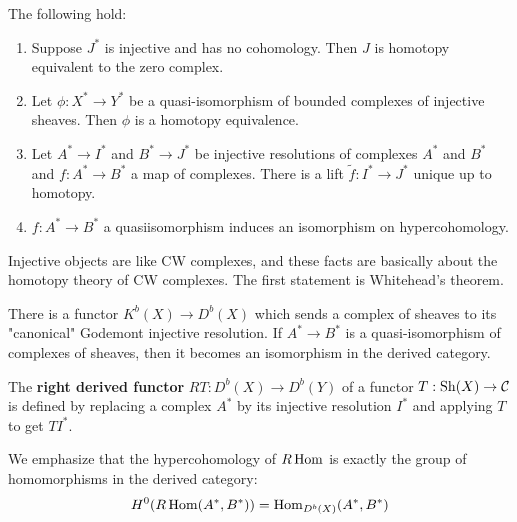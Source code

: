 \documentclass[12pt]{article}
\begin{document}
\begin{corollary}
The following hold:
\begin{enumerate}
    \item Suppose $J^*$ is injective and has no cohomology. Then $J$ 
    is homotopy equivalent to the zero complex.
    \item Let $\phi:X^*\to Y^*$ be a quasi-isomorphism of bounded complexes of injective sheaves. 
    Then $\phi$ is a homotopy equivalence.
    \item Let $A^*\to I^*$ and $B^*\to J^*$ be injective resolutions of complexes $A^*$ 
    and $B^*$ and $f:A^*\to B^*$ a map of complexes. There is a lift 
    $\tilde f:I^*\to J^*$ unique up to homotopy.
    \item $f:A^*\to B^*$ a quasiisomorphism induces an isomorphism on hypercohomology.
\end{enumerate} 

\begin{remark}
    Injective objects are like CW complexes, and these facts are basically about 
    the homotopy theory of CW complexes. The first statement is Whitehead's theorem.
\end{remark}
There is a functor $K^b(X) \to D^b(X)$ which sends a complex of sheaves 
to its "canonical" Godemont injective resolution. If $A^* \to B^*$
is a quasi-isomorphism of complexes of sheaves, then it becomes 
an isomorphism in the derived category.

\begin{definition}
    The \textbf{right derived functor} $RT: D^b(X) \to D^b(Y)$ of a functor 
    $T:\operatorname{Sh}(X)\to {\mathcal{C}}$ is defined by replacing a complex $A^*$ 
    by its injective resolution $I^*$ and applying $T$ to get $TI^*$.
\end{definition}

\begin{remark}
    We emphasize that the hypercohomology of $R\operatorname{Hom}$ is exactly the group of 
    homomorphisms in the derived category: \begin{align*}
        H^0(R\operatorname{Hom}(A^*,B^*)) = \operatorname{Hom}_{D^b(X)}(A^*,B^*)
    \end{align*}
\end{remark}


\end{corollary}
\end{document}
